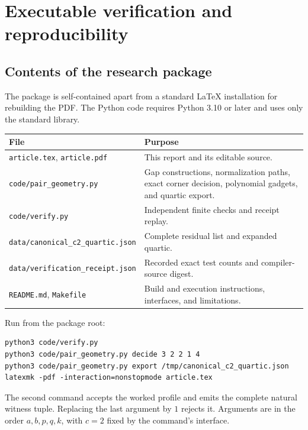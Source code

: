 \documentclass[11pt,letterpaper]{article}
\theoremstyle{definition}
\theoremstyle{remark}
\newcommand{\code}[1]{\nolinkurl{#1}}
\begin{document}
\section{Executable verification and reproducibility}\label{gts:po:sec:software}
\subsection{Contents of the research package}
The package is self-contained apart from a standard LaTeX installation for rebuilding the PDF. The Python code requires Python 3.10 or later and uses only the standard library.
\begin{center}
\small
\begin{tabular}{p{.45\linewidth}p{.46\linewidth}}
\toprule
File & Purpose\\
\midrule
\code{article.tex}, \code{article.pdf} & This report and its editable source.\\
\code{code/pair_geometry.py} & Gap constructions, normalization paths, exact corner decision, polynomial gadgets, and quartic export.\\
\code{code/verify.py} & Independent finite checks and receipt replay.\\
\code{data/canonical_c2_quartic.json} & Complete residual list and expanded quartic.\\
\code{data/verification_receipt.json} & Recorded exact test counts and compiler-source digest.\\
\code{README.md}, \code{Makefile} & Build and execution instructions, interfaces, and limitations.\\
\bottomrule
\end{tabular}
\end{center}

Run from the package root:
\begin{lstlisting}
python3 code/verify.py
python3 code/pair_geometry.py decide 3 2 2 1 4
python3 code/pair_geometry.py export /tmp/canonical_c2_quartic.json
latexmk -pdf -interaction=nonstopmode article.tex
\end{lstlisting}
The second command accepts the worked profile and emits the complete natural witness tuple. Replacing the last argument by $1$ rejects it. Arguments are in the order $a,b,p,q,k$, with $c=2$ fixed by the command's interface.
\end{document}
